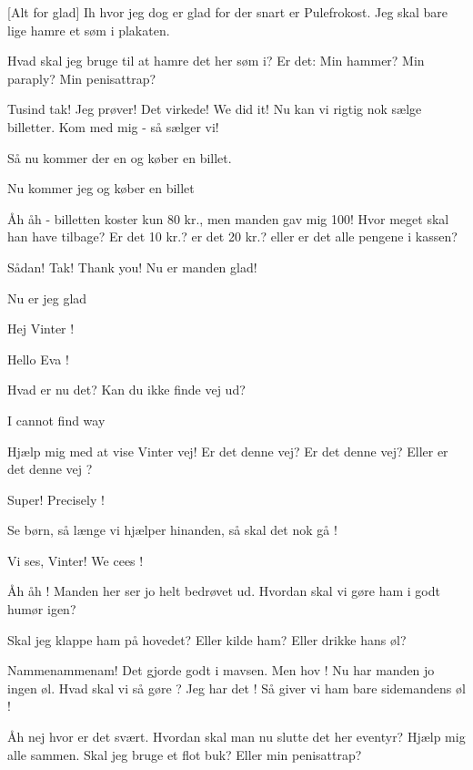 \documentclass[a4paper,11pt]{article}
\begin{document}
\begin{sketch}


[Alt for glad] Ih hvor jeg dog er glad for der snart er Pulefrokost. Jeg skal bare lige hamre et søm i plakaten.

Hvad skal jeg bruge til at hamre det her søm i? Er det: Min hammer? Min paraply? Min penisattrap? 

Tusind tak! Jeg prøver! Det virkede! We did it!
Nu kan vi rigtig nok sælge billetter. Kom med mig - så sælger vi!


 Så nu kommer der en og køber en billet.

 Nu kommer jeg og køber en billet

Åh åh - billetten koster kun 80 kr., men manden gav mig 100! Hvor meget skal han have tilbage? Er det 10 kr.? er det 20 kr.? eller er det alle pengene i kassen? 

 Sådan! Tak! Thank you! Nu er manden glad!

 Nu er jeg glad


Hej Vinter !

 Hello Eva !

Hvad er nu det? Kan du ikke finde vej ud? 

 I cannot find way

 Hjælp mig med at vise Vinter vej! Er det denne vej?
 Er det denne vej? 
 Eller er det denne vej ?

 Super! 
 Precisely !


  Se børn, så længe vi hjælper hinanden, så skal det nok gå !

 Vi ses, Vinter!
 We cees !


 Åh åh ! Manden her ser jo helt bedrøvet ud. Hvordan skal vi gøre ham i godt humør igen?

 Skal jeg klappe ham på hovedet? Eller kilde ham? Eller drikke hans øl?

 Nammenammenam! Det gjorde godt i mavsen.
Men hov ! Nu har manden jo ingen øl. Hvad skal vi så gøre ? Jeg har det ! Så giver vi ham bare sidemandens øl ! 

Åh nej hvor er det svært. Hvordan skal man nu slutte det her eventyr? Hjælp mig alle sammen. Skal jeg bruge et flot buk? Eller min penisattrap?


\end{sketch}
\end{document}
